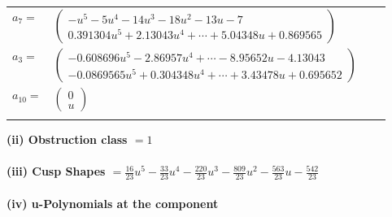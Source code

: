\documentclass[1p]{elsarticle_modified}
\theoremstyle{definition}
\begin{document}
\begin{tabular}{m{7pt} m{180pt} m{7pt} m{180pt} }
\flushright $a_{7}=$&$\begin{pmatrix}- u^5-5 u^4-14 u^3-18 u^2-13 u-7\\0.391304 u^{5}+2.13043 u^{4}+\cdots+5.04348 u+0.869565\end{pmatrix}$ \\
\flushright $a_{3}=$&$\begin{pmatrix}-0.608696 u^{5}-2.86957 u^{4}+\cdots-8.95652 u-4.13043\\-0.0869565 u^{5}+0.304348 u^{4}+\cdots+3.43478 u+0.695652\end{pmatrix}$ \\
\flushright $a_{10}=$&$\begin{pmatrix}0\\u\end{pmatrix}$\\&\end{tabular}
\flushleft \textbf{(ii) Obstruction class $= 1$}\\~\\
\flushleft \textbf{(iii) Cusp Shapes $= \frac{16}{23} u^5-\frac{33}{23} u^4-\frac{220}{23} u^3-\frac{809}{23} u^2-\frac{563}{23} u-\frac{542}{23}$}\\~\\
\newpage\renewcommand{\arraystretch}{1}
\flushleft \textbf{(iv) u-Polynomials at the component}\newline \\
\end{document}
